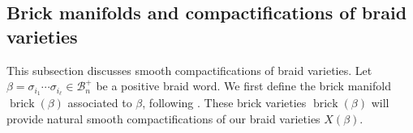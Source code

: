 \documentclass[10pt]{amsart}
\theoremstyle{plain}
\theoremstyle{definition}
\theoremstyle{remark}
\numberwithin{equation}{section}
\newcommand{\N}{\mathbb{N}}
\newcommand{\cB}{\mathcal{B}}
\newcommand{\brick}{\operatorname{brick}}
\def\Le{\reflectbox{$\mathrm{L}$}}
\begin{document}

\color{black}


\subsection{Brick manifolds and compactifications of braid varieties}\label{ssec:compactify}
This subsection discusses smooth compactifications of braid varieties. Let $\beta=\sigma_{i_{1}}\cdots \sigma_{i_{\ell}}\in\cB_n^+$ be a positive braid word. We first define the brick manifold $\brick(\beta)$ associated to $\beta$, following \cite{Escobar}. These brick varieties $\brick(\beta)$ will provide natural smooth compactifications of our braid varieties $X(\beta)$.
\end{document}
